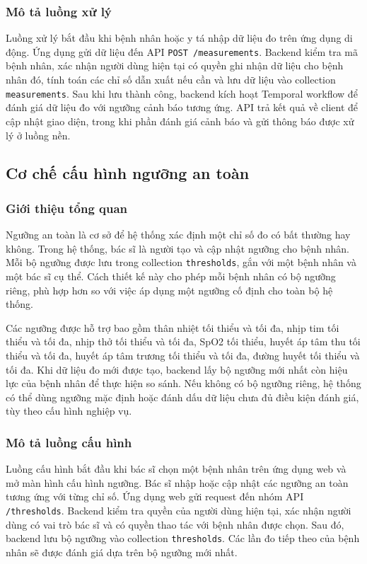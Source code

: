\subsubsection{Mô tả luồng xử lý}
\par Luồng xử lý bắt đầu khi bệnh nhân hoặc y tá nhập dữ liệu đo trên ứng dụng di động. Ứng dụng gửi dữ liệu đến API \texttt{POST /measurements}. Backend kiểm tra mã bệnh nhân, xác nhận người dùng hiện tại có quyền ghi nhận dữ liệu cho bệnh nhân đó, tính toán các chỉ số dẫn xuất nếu cần và lưu dữ liệu vào collection \texttt{measurements}. Sau khi lưu thành công, backend kích hoạt Temporal workflow để đánh giá dữ liệu đo với ngưỡng cảnh báo tương ứng. API trả kết quả về client để cập nhật giao diện, trong khi phần đánh giá cảnh báo và gửi thông báo được xử lý ở luồng nền.

\subsection{Cơ chế cấu hình ngưỡng an toàn}

\subsubsection{Giới thiệu tổng quan}
\par Ngưỡng an toàn là cơ sở để hệ thống xác định một chỉ số đo có bất thường hay không. Trong hệ thống, bác sĩ là người tạo và cập nhật ngưỡng cho bệnh nhân. Mỗi bộ ngưỡng được lưu trong collection \texttt{thresholds}, gắn với một bệnh nhân và một bác sĩ cụ thể. Cách thiết kế này cho phép mỗi bệnh nhân có bộ ngưỡng riêng, phù hợp hơn so với việc áp dụng một ngưỡng cố định cho toàn bộ hệ thống.

\par Các ngưỡng được hỗ trợ bao gồm thân nhiệt tối thiểu và tối đa, nhịp tim tối thiểu và tối đa, nhịp thở tối thiểu và tối đa, SpO2 tối thiểu, huyết áp tâm thu tối thiểu và tối đa, huyết áp tâm trương tối thiểu và tối đa, đường huyết tối thiểu và tối đa. Khi dữ liệu đo mới được tạo, backend lấy bộ ngưỡng mới nhất còn hiệu lực của bệnh nhân để thực hiện so sánh. Nếu không có bộ ngưỡng riêng, hệ thống có thể dùng ngưỡng mặc định hoặc đánh dấu dữ liệu chưa đủ điều kiện đánh giá, tùy theo cấu hình nghiệp vụ.

\subsubsection{Mô tả luồng cấu hình}
\par Luồng cấu hình bắt đầu khi bác sĩ chọn một bệnh nhân trên ứng dụng web và mở màn hình cấu hình ngưỡng. Bác sĩ nhập hoặc cập nhật các ngưỡng an toàn tương ứng với từng chỉ số. Ứng dụng web gửi request đến nhóm API \texttt{/thresholds}. Backend kiểm tra quyền của người dùng hiện tại, xác nhận người dùng có vai trò bác sĩ và có quyền thao tác với bệnh nhân được chọn. Sau đó, backend lưu bộ ngưỡng vào collection \texttt{thresholds}. Các lần đo tiếp theo của bệnh nhân sẽ được đánh giá dựa trên bộ ngưỡng mới nhất.

